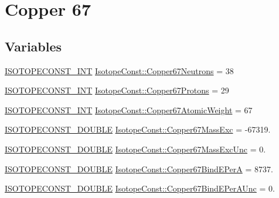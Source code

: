 \hypertarget{group___isotope_const-_copper-_cu67}{}\section{Copper 67}
\label{group___isotope_const-_copper-_cu67}
\subsection*{Variables}
\begin{DoxyCompactItemize}
\item 
\mbox{\hyperlink{group___isotope_const-_macros_ga5f18360b3e99483a35c32d789e62621c}{I\+S\+O\+T\+O\+P\+E\+C\+O\+N\+S\+T\+\_\+\+I\+NT}} \mbox{\hyperlink{group___isotope_const-_copper-_cu67_ga2e13d95682139d0e2f0ae7fbaed29605}{Isotope\+Const\+::\+Copper67\+Neutrons}} = 38
\item 
\mbox{\hyperlink{group___isotope_const-_macros_ga5f18360b3e99483a35c32d789e62621c}{I\+S\+O\+T\+O\+P\+E\+C\+O\+N\+S\+T\+\_\+\+I\+NT}} \mbox{\hyperlink{group___isotope_const-_copper-_cu67_ga1d538f566fab38e08b03c0dea4ca1384}{Isotope\+Const\+::\+Copper67\+Protons}} = 29
\item 
\mbox{\hyperlink{group___isotope_const-_macros_ga5f18360b3e99483a35c32d789e62621c}{I\+S\+O\+T\+O\+P\+E\+C\+O\+N\+S\+T\+\_\+\+I\+NT}} \mbox{\hyperlink{group___isotope_const-_copper-_cu67_gaaa2d5faaead7bbe6d3167c8138505bc0}{Isotope\+Const\+::\+Copper67\+Atomic\+Weight}} = 67
\item 
\mbox{\hyperlink{group___isotope_const-_macros_ga8f45a7272ce02c0b4c65c44636ed719a}{I\+S\+O\+T\+O\+P\+E\+C\+O\+N\+S\+T\+\_\+\+D\+O\+U\+B\+LE}} \mbox{\hyperlink{group___isotope_const-_copper-_cu67_ga84aa1aaf091037a467c9ac4a73f86b2f}{Isotope\+Const\+::\+Copper67\+Mass\+Exc}} = -\/67319.
\item 
\mbox{\hyperlink{group___isotope_const-_macros_ga8f45a7272ce02c0b4c65c44636ed719a}{I\+S\+O\+T\+O\+P\+E\+C\+O\+N\+S\+T\+\_\+\+D\+O\+U\+B\+LE}} \mbox{\hyperlink{group___isotope_const-_copper-_cu67_gadf05655c5ffcb2b06e483e56dc824314}{Isotope\+Const\+::\+Copper67\+Mass\+Exc\+Unc}} = 0.
\item 
\mbox{\hyperlink{group___isotope_const-_macros_ga8f45a7272ce02c0b4c65c44636ed719a}{I\+S\+O\+T\+O\+P\+E\+C\+O\+N\+S\+T\+\_\+\+D\+O\+U\+B\+LE}} \mbox{\hyperlink{group___isotope_const-_copper-_cu67_ga7aa494f30ff2ae5244e0f6c22002ee00}{Isotope\+Const\+::\+Copper67\+Bind\+E\+PerA}} = 8737.
\item 
\mbox{\hyperlink{group___isotope_const-_macros_ga8f45a7272ce02c0b4c65c44636ed719a}{I\+S\+O\+T\+O\+P\+E\+C\+O\+N\+S\+T\+\_\+\+D\+O\+U\+B\+LE}} \mbox{\hyperlink{group___isotope_const-_copper-_cu67_ga4c05862ccf134751ab110a60c8712684}{Isotope\+Const\+::\+Copper67\+Bind\+E\+Per\+A\+Unc}} = 0.

\end{DoxyCompactItemize}
